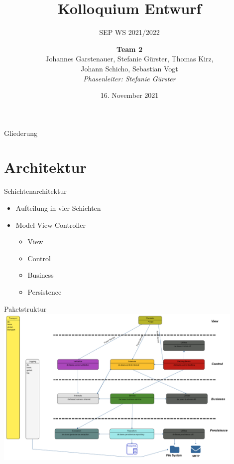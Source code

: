 \documentclass{beamer}
\title{Kolloquium Entwurf}
\subtitle{SEP WS 2021/2022}
\date{\small 16. November 2021}
\author{\textbf{Team 2} \\ \small {Johannes Garstenauer, Stefanie Gürster, Thomas Kirz,\\ Johann Schicho, Sebastian Vogt} \\ \vspace{0.5cm}\emph{Phasenleiter: Stefanie Gürster}\normalsize}
\begin{document}
    \begin{frame}
        \titlepage
    \end{frame}

    \begin{frame}{Gliederung}
        \tableofcontents
    \end{frame}


    \section{Architektur}

    \begin{frame}{Schichtenarchitektur}
        \begin{itemize}

            \item Aufteilung in vier Schichten \pause
            \item Model View Controller
            \pause
            \begin{itemize}
                \item View
                \item Control
                \item Business
                \item Persistence
            \end{itemize}

        \end{itemize}
    \end{frame}

    \begin{frame}{Paketstruktur}
        \centering
        \includegraphics[width=0.9\textwidth]{../../docs/Entwurf/graphics/Paketdiagramm9.0.png}
    \end{frame}
\end{document}

